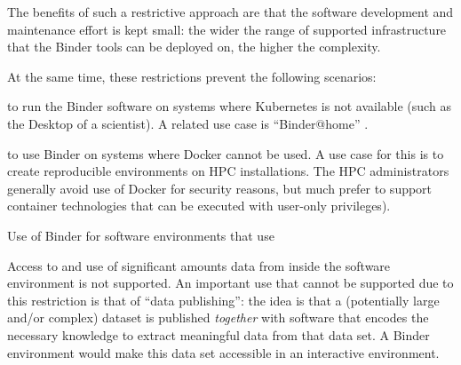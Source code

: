 \begin{workpackage}[
  id=impact,
  wphases=0-36!1.17,
  swsites,
  title=Broadening impact,
  short=Impact,
  lead=SRL,
  SRLRM=24,
  MPRM=12,
  QSRM=2,
  IFRRM=4,
]
\begin{wpdescription}
The benefits of such a restrictive approach are that the software development
and maintenance effort is kept small: the wider the range of supported
infrastructure that the Binder tools can be deployed on, the higher the
complexity.

At the same time, these restrictions prevent the following scenarios:
\begin{compactitem}
\item to run the Binder software on systems where Kubernetes is not available (such as
  the Desktop of a scientist). A related use case is ``Binder@home''
  .
\item to use Binder on systems where Docker cannot be used. A use case for this
  is to create reproducible environments on HPC installations. The HPC
  administrators generally avoid use of Docker for security reasons, but much
  prefer to support container technologies that can be executed with
  user-only privileges). 
\item Use of Binder for software environments that use 
\item Access to and use of significant amounts data from inside the software
  environment is not supported. An important use that cannot be supported due to
  this restriction is that of ``data publishing'': the idea is that a
  (potentially large and/or complex) dataset is published \emph{together} with
  software that encodes the necessary knowledge to extract meaningful data from
  that data set. A Binder environment would make this data set accessible in an
  interactive environment. 
 \end{compactitem}


\end{wpdescription}
\end{workpackage}
